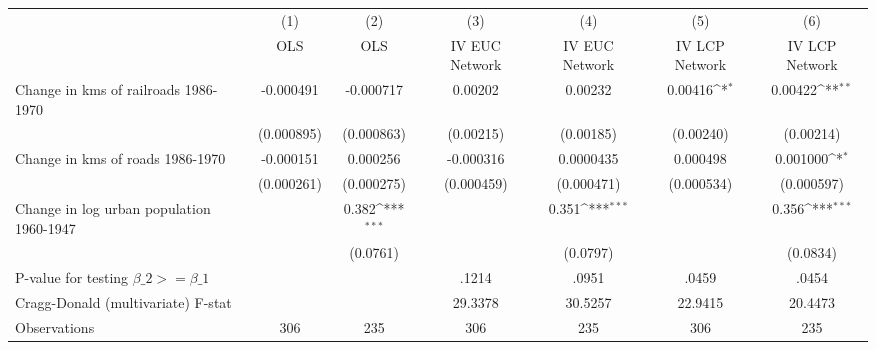 {
\def\sym#1{\ifmmode^{#1}\else\(^{#1}\)\fi}
\begin{tabular}{l*{6}{c}}
\hline\hline
                &\multicolumn{1}{c}{(1)}&\multicolumn{1}{c}{(2)}&\multicolumn{1}{c}{(3)}&\multicolumn{1}{c}{(4)}&\multicolumn{1}{c}{(5)}&\multicolumn{1}{c}{(6)}\\
                &\multicolumn{1}{c}{OLS}&\multicolumn{1}{c}{OLS}&\multicolumn{1}{c}{IV EUC Network}&\multicolumn{1}{c}{IV EUC Network}&\multicolumn{1}{c}{IV LCP Network}&\multicolumn{1}{c}{IV LCP Network}\\
\hline
Change in kms of railroads 1986-1970&-0.000491         &-0.000717         &  0.00202         &  0.00232         &  0.00416\sym{*}  &  0.00422\sym{**} \\
                &(0.000895)         &(0.000863)         &(0.00215)         &(0.00185)         &(0.00240)         &(0.00214)         \\
[1em]
Change in kms of roads 1986-1970&-0.000151         & 0.000256         &-0.000316         &0.0000435         & 0.000498         & 0.001000\sym{*}  \\
                &(0.000261)         &(0.000275)         &(0.000459)         &(0.000471)         &(0.000534)         &(0.000597)         \\
[1em]
Change in log urban population 1960-1947&                  &    0.382\sym{***}&                  &    0.351\sym{***}&                  &    0.356\sym{***}\\
                &                  & (0.0761)         &                  & (0.0797)         &                  & (0.0834)         \\
\hline
P-value for testing $\beta\_{2} >= \beta\_{1}$&                  &                  &    .1214         &    .0951         &    .0459         &    .0454         \\
Cragg-Donald (multivariate) F-stat&                  &                  &  29.3378         &  30.5257         &  22.9415         &  20.4473         \\
Observations    &      306         &      235         &      306         &      235         &      306         &      235         \\
\hline\hline
\end{tabular}
}
